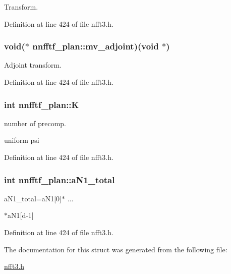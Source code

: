 Transform. 



Definition at line 424 of file nfft3.\-h.

\hypertarget{structnnfftf__plan_adcff4592ce1838e342b92633e9f8de42}{
\subsubsection[{mv\-\_\-adjoint}]{\setlength{\rightskip}{0pt plus 5cm}void($\ast$ nnfftf\-\_\-plan\-::mv\-\_\-adjoint)(void $\ast$)}}\label{structnnfftf__plan_adcff4592ce1838e342b92633e9f8de42}


Adjoint transform. 



Definition at line 424 of file nfft3.\-h.

\hypertarget{structnnfftf__plan_a9d2bd4132187064cf5f6c301f7ce5125}{
\subsubsection[{K}]{\setlength{\rightskip}{0pt plus 5cm}int nnfftf\-\_\-plan\-::\-K}}\label{structnnfftf__plan_a9d2bd4132187064cf5f6c301f7ce5125}


number of precomp. 

uniform psi 

Definition at line 424 of file nfft3.\-h.

\hypertarget{structnnfftf__plan_a4bfc7abd18935616365f7925b2994e38}{
\subsubsection[{a\-N1\-\_\-total}]{\setlength{\rightskip}{0pt plus 5cm}int nnfftf\-\_\-plan\-::a\-N1\-\_\-total}}\label{structnnfftf__plan_a4bfc7abd18935616365f7925b2994e38}


a\-N1\-\_\-total=a\-N1\mbox{[}0\mbox{]}$\ast$ ... 

$\ast$a\-N1\mbox{[}d-\/1\mbox{]} 

Definition at line 424 of file nfft3.\-h.



The documentation for this struct was generated from the following file\-:\begin{DoxyCompactItemize}
\item 
\hyperlink{nfft3_8h}{nfft3.\-h}\end{DoxyCompactItemize}
